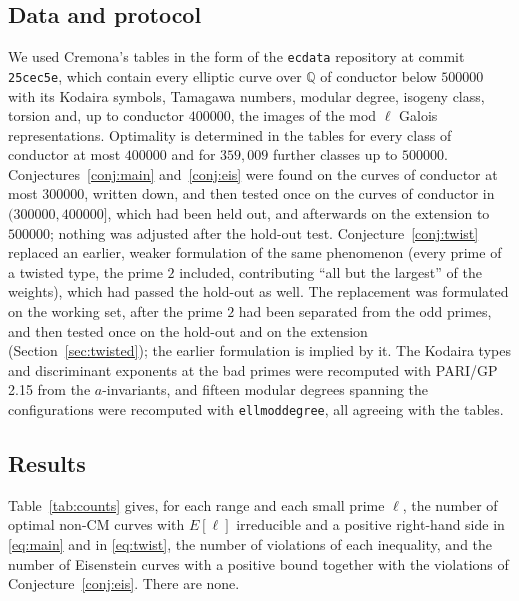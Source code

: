 \documentclass[11pt]{amsart}
\theoremstyle{definition}
\newcommand{\Q}{\mathbb{Q}}
\begin{document}
\subsection{Data and protocol}
We used Cremona's tables \cite{Cremona97} in the form of the \texttt{ecdata} repository at commit \texttt{25cec5e}, which contain every elliptic curve over $\Q$ of conductor below $500000$ with its Kodaira symbols, Tamagawa numbers, modular degree, isogeny class, torsion and, up to conductor $400000$, the images of the mod $\ell$ Galois representations. Optimality is determined in the tables for every class of conductor at most $400000$ and for $359{,}009$ further classes up to $500000$. Conjectures~\ref{conj:main} and~\ref{conj:eis} were found on the curves of conductor at most $300000$, written down, and then tested once on the curves of conductor in $(300000,400000]$, which had been held out, and afterwards on the extension to $500000$; nothing was adjusted after the hold-out test. Conjecture~\ref{conj:twist} replaced an earlier, weaker formulation of the same phenomenon (every prime of a twisted type, the prime $2$ included, contributing ``all but the largest'' of the weights), which had passed the hold-out as well. The replacement was formulated on the working set, after the prime $2$ had been separated from the odd primes, and then tested once on the hold-out and on the extension (Section~\ref{sec:twisted}); the earlier formulation is implied by it. The Kodaira types and discriminant exponents at the bad primes were recomputed with PARI/GP 2.15 \cite{PARI} from the $a$-invariants, and fifteen modular degrees spanning the configurations were recomputed with \texttt{ellmoddegree}, all agreeing with the tables.

\subsection{Results}
Table~\ref{tab:counts} gives, for each range and each small prime $\ell$, the number of optimal non-CM curves with $E[\ell]$ irreducible and a positive right-hand side in \eqref{eq:main} and in \eqref{eq:twist}, the number of violations of each inequality, and the number of Eisenstein curves with a positive bound together with the violations of Conjecture~\ref{conj:eis}. There are none.

\begin{table}[ht]
\centering\footnotesize

\caption{Verification counts. ``\eqref{eq:main} $>0$'' is the number of curves with $E[\ell]$ irreducible, not CM, for which the right-hand side of \eqref{eq:main} is positive, and ``viol.'' the number of violations; likewise for \eqref{eq:twist}. The last column counts the Eisenstein curves with a positive bound in \eqref{eq:main} and the violations of Conjecture~\ref{conj:eis}.}\label{tab:counts}
\end{table}
\end{document}
